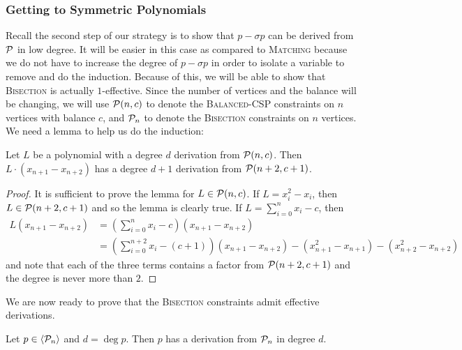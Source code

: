 \subsubsection{Getting to Symmetric Polynomials}
Recall the second step of our strategy is to show that $p - \sigma p$ can be derived from $\mathcal P$ in low degree. It will be easier in this case as compared to \textsc{Matching} because we do not have to increase the degree of $p - \sigma p$ in order to isolate a variable to remove and do the induction. Because of this, we will be able to show that \textsc{Bisection} is actually $1$-effective.
Since the number of vertices and the balance will be changing, we will use $\mathcal P(n,c)$ to denote the \textsc{Balanced-CSP} constraints on $n$ vertices with balance $c$, and $\mathcal P_n$ to denote the \textsc{Bisection} constraints on $n$ vertices.
We need a lemma to help us do the induction:
\begin{lemma}\label{lem:bcsp-induct}
Let $L$ be a polynomial with a degree $d$ derivation from $\mathcal P(n,c)$. Then $L\cdot (x_{n+1} - x_{n+2})$ has a degree $d+1$ derivation from $\mathcal P(n+2,c+1)$. 
\end{lemma}
\begin{proof}
It is sufficient to prove the lemma for $L \in \mathcal P(n,c)$. If $L = x_i^2 - x_i$, then $L \in \mathcal P(n+2,c+1)$ and so the lemma is clearly true. If $L = \sum_{i=0}^n x_i - c$, then 
\begin{align*}
L(x_{n+1} - x_{n+2}) &= \left(\sum_{i=0}^n x_i - c\right)(x_{n+1} - x_{n+2}) \\
&= \left(\sum_{i=0}^{n+2} x_i - (c+1)\right)(x_{n+1} - x_{n+2}) - (x_{n+1}^2 - x_{n+1}) - (x_{n+2}^2 - x_{n+2})
\end{align*}
and note that each of the three terms contains a factor from $\mathcal P(n+2,c+1)$ and the degree is never more than $2$. 
\end{proof}
We are now ready to prove that the \textsc{Bisection} constraints admit effective derivations.
\begin{theorem}\label{thm:bisec-effective}
Let $p \in \langle \mathcal P_n \rangle$ and $d = \deg p$. Then $p$ has a derivation from $\mathcal P_n$ in degree $d$. 
\end{theorem}
